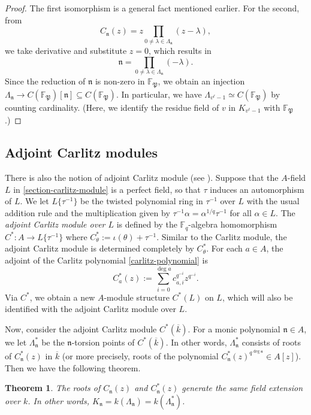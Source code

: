 \documentclass[11pt]{amsart}
\theoremstyle{plain}
\newtheorem{thm}{Theorem}[subsection]
\theoremstyle{definition}
\theoremstyle{remark}
\numberwithin{equation}{section}
\newcommand{\FF}{\mathbb{F}}
\newcommand{\nfk}{\mathfrak{n}}
\newcommand{\Pfk}{\mathfrak{P}}
\newcommand{\ovl}{\overline}
\newcommand{\sbe}{\subseteq}
\newcommand{\Fq}{\FF_q}
\newcommand{\T}{\theta}
\let\l\ell
\begin{document}
	\begin{proof}
		The first isomorphism is a general fact mentioned earlier.
		For the second, from
		$$
		C_\nfk(z) = z\prod_{0\neq \lambda \in \Lambda_\nfk} (z - \lambda),
		$$
		we take derivative and substitute $z=0$, which results in
		$$
		\nfk = \prod_{0\neq \lambda \in \Lambda_\nfk} (-\lambda).
		$$
		Since the reduction of $\nfk$ is non-zero in $\FF_{\Pfk}$, we obtain an injection $\Lambda_{\nfk} \to C(\FF_{\Pfk})[\nfk] \sbe C(\FF_\Pfk)$.
		In particular, we have $\Lambda_{v^\l-1} \simeq C(\FF_{\Pfk})$ by counting cardinality.
		(Here, we identify the residue field of $v$ in $K_{v^\l-1}$ with $\FF_{\Pfk}$.)
	\end{proof}
	
	\subsection{Adjoint Carlitz modules}
	
	There is also the notion of adjoint Carlitz module (see \cite[Section 3.7]{goss1996basic}).
	Suppose that the $A$-field $L$ in \ref{section-carlitz-module} is a perfect field, so that $\tau$ induces an automorphism of $L$.
	We let $L\{\tau^{-1}\}$ be the twisted polynomial ring in $\tau^{-1}$ over $L$ with the usual addition rule and the multiplication given by $\tau^{-1} \alpha = \alpha^{1/q} \tau^{-1}$ for all $\alpha \in L$.
	The \textit{adjoint Carlitz module over $L$} is defined by the $\Fq$-algebra homomorphism $C^*: A \to L\{\tau^{-1}\}$ where $C^*_\T := \iota(\T) + \tau^{-1}$.
	Similar to the Carlitz module, the adjoint Carlitz module is determined completely by $C^*_\T$.
	For each $a\in A$, the adjoint of the Carlitz polynomial \eqref{carlitz-polynomial} is
	$$
	C^*_a(z) := \sum_{i=0}^{\deg a} c_{a,i}^{q^{-i}} z^{q^{-i}}.
	$$
	Via $C^*$, we obtain a new $A$-module structure $C^*(L)$ on $L$, which will also be identified with the adjoint Carlitz module over $L$.
	
	Now, consider the adjoint Carlitz module $C^*(\ovl{k})$.
	For a monic polynomial $\nfk \in A$, we let $\Lambda_\nfk^*$ be the $\nfk$-torsion points of $C^*(\ovl{k})$.
	In other words, $\Lambda_\nfk^*$ consists of roots of $C_\nfk^*(z)$ in $\ovl{k}$
	(or more precisely, roots of the polynomial $C_\nfk^*(z)^{q^{\deg \nfk}} \in A[z]$).
	Then we have the following theorem.
	
	\begin{thm}      \label{goss-1.7.11}
		The roots of $C_\nfk(z)$ and $C_\nfk^*(z)$ generate the same field extension over $k$. In other words, $K_\nfk = k(\Lambda_\nfk) = k(\Lambda_\nfk^*)$.
	\end{thm}
	
\end{document}
